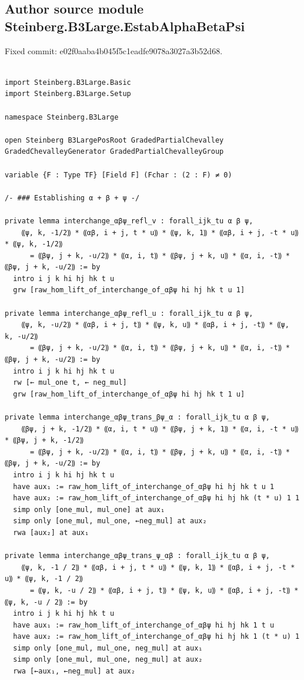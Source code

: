\subsection*{Author source module Steinberg.B3Large.EstabAlphaBetaPsi}
\noindent Fixed commit: e02f0aaba4b045f5c1eadfe9078a3027a3b52d68.
\begin{Verbatim}

import Steinberg.B3Large.Basic
import Steinberg.B3Large.Setup

namespace Steinberg.B3Large

open Steinberg B3LargePosRoot GradedPartialChevalley GradedChevalleyGenerator GradedPartialChevalleyGroup

variable {F : Type TF} [Field F] (Fchar : (2 : F) ≠ 0)

/- ### Establishing α + β + ψ -/

private lemma interchange_αβψ_refl_v : forall_ijk_tu α β ψ,
    ⸨ψ, k, -1/2⸩ * ⸨αβ, i + j, t * u⸩ * ⸨ψ, k, 1⸩ * ⸨αβ, i + j, -t * u⸩ * ⸨ψ, k, -1/2⸩
      = ⸨βψ, j + k, -u/2⸩ * ⸨α, i, t⸩ * ⸨βψ, j + k, u⸩ * ⸨α, i, -t⸩ * ⸨βψ, j + k, -u/2⸩ := by
  intro i j k hi hj hk t u
  grw [raw_hom_lift_of_interchange_of_αβψ hi hj hk t u 1]

private lemma interchange_αβψ_refl_u : forall_ijk_tu α β ψ,
    ⸨ψ, k, -u/2⸩ * ⸨αβ, i + j, t⸩ * ⸨ψ, k, u⸩ * ⸨αβ, i + j, -t⸩ * ⸨ψ, k, -u/2⸩
      = ⸨βψ, j + k, -u/2⸩ * ⸨α, i, t⸩ * ⸨βψ, j + k, u⸩ * ⸨α, i, -t⸩ * ⸨βψ, j + k, -u/2⸩ := by
  intro i j k hi hj hk t u
  rw [← mul_one t, ← neg_mul]
  grw [raw_hom_lift_of_interchange_of_αβψ hi hj hk t 1 u]

private lemma interchange_αβψ_trans_βψ_α : forall_ijk_tu α β ψ,
    ⸨βψ, j + k, -1/2⸩ * ⸨α, i, t * u⸩ * ⸨βψ, j + k, 1⸩ * ⸨α, i, -t * u⸩ * ⸨βψ, j + k, -1/2⸩
      = ⸨βψ, j + k, -u/2⸩ * ⸨α, i, t⸩ * ⸨βψ, j + k, u⸩ * ⸨α, i, -t⸩ * ⸨βψ, j + k, -u/2⸩ := by
  intro i j k hi hj hk t u
  have aux₁ := raw_hom_lift_of_interchange_of_αβψ hi hj hk t u 1
  have aux₂ := raw_hom_lift_of_interchange_of_αβψ hi hj hk (t * u) 1 1
  simp only [one_mul, mul_one] at aux₁
  simp only [one_mul, mul_one, ←neg_mul] at aux₂
  rwa [aux₂] at aux₁

private lemma interchange_αβψ_trans_ψ_αβ : forall_ijk_tu α β ψ,
    ⸨ψ, k, -1 / 2⸩ * ⸨αβ, i + j, t * u⸩ * ⸨ψ, k, 1⸩ * ⸨αβ, i + j, -t * u⸩ * ⸨ψ, k, -1 / 2⸩
      = ⸨ψ, k, -u / 2⸩ * ⸨αβ, i + j, t⸩ * ⸨ψ, k, u⸩ * ⸨αβ, i + j, -t⸩ * ⸨ψ, k, -u / 2⸩ := by
  intro i j k hi hj hk t u
  have aux₁ := raw_hom_lift_of_interchange_of_αβψ hi hj hk 1 t u
  have aux₂ := raw_hom_lift_of_interchange_of_αβψ hi hj hk 1 (t * u) 1
  simp only [one_mul, mul_one, neg_mul] at aux₁
  simp only [one_mul, mul_one, neg_mul] at aux₂
  rwa [←aux₁, ←neg_mul] at aux₂


\end{Verbatim}
